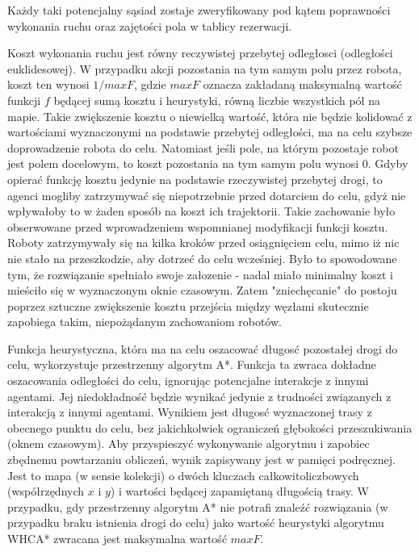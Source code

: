 Każdy taki potencjalny sąsiad zostaje zweryfikowany pod kątem poprawności wykonania ruchu oraz zajętości pola w tablicy rezerwacji.

Koszt wykonania ruchu jest równy reczywistej przebytej odległosci (odległości euklidesowej).
W przypadku akcji pozostania na tym samym polu przez robota, koszt ten wynosi $1 / maxF$, gdzie $maxF$ oznacza zakładaną maksymalną wartość funkcji $f$ będącej sumą kosztu i heurystyki, równą liczbie wszystkich pól na mapie.
Takie zwiększenie kosztu o niewielką wartość, która nie będzie kolidować z wartościami wyznaczonymi na podstawie przebytej odległości, ma na celu szybsze doprowadzenie robota do celu. Natomiast jeśli pole, na którym pozostaje robot jest polem docelowym, to koszt pozostania na tym samym polu wynosi 0.
Gdyby opierać funkcję kosztu jedynie na podstawie rzeczywistej przebytej drogi, to agenci mogliby zatrzymywać się niepotrzebnie przed dotarciem do celu, gdyż nie wpływałoby to w żaden sposób na koszt ich trajektorii. Takie zachowanie było obserwowane przed wprowadzeniem wspomnianej modyfikacji funkcji kosztu.
Roboty zatrzymywały się na kilka kroków przed osiągnięciem celu, mimo iż nic nie stało na przeszkodzie, aby dotrzeć do celu wcześniej. Było to spowodowane tym, że rozwiązanie spełniało swoje załozenie - nadal miało minimalny koszt i mieściło się w wyznaczonym oknie czasowym.
Zatem "zniechęcanie" do postoju poprzez sztuczne zwiększenie kosztu przejścia między węzłami skutecznie zapobiega takim, niepożądanym zachowaniom robotów.

Funkcja heurystyczna, która ma na celu oszacować długosć pozostałej drogi do celu, wykorzystuje przestrzenny algorytm A*.
Funkcja ta zwraca dokładne oszacowania odległości do celu, ignorując potencjalne interakcje z innymi agentami. Jej niedokładność będzie wynikać jedynie z trudności związanych z interakcją z innymi agentami.
Wynikiem jest długosć wyznaczonej trasy z obecnego punktu do celu, bez jakichkolwiek ograniczeń głębokości przeszukiwania (oknem czasowym).
Aby przyspieszyć wykonywanie algorytmu i zapobiec zbędnemu powtarzaniu obliczeń, wynik zapisywany jest w pamięci podręcznej. Jest to mapa (w sensie kolekcji) o dwóch kluczach całkowitoliczbowych (współrzędnych $x$ i $y$) i wartości będącej zapamiętaną długością trasy.
W przypadku, gdy przestrzenny algorytm A* nie potrafi znaleźć rozwiązania (w przypadku braku istnienia drogi do celu) jako wartość heurystyki algorytmu WHCA* zwracana jest maksymalna wartość $maxF$.

